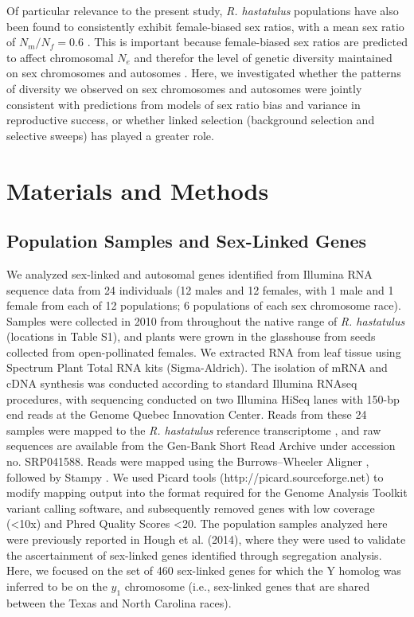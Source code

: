 \documentclass[9pt,twocolumn,twoside]{gsajnl}
\begin{document}
Of particular relevance to the present study, \textit{R. hastatulus} populations have also been found to consistently exhibit female-biased sex ratios, with a mean sex ratio of $N_{m}/N_{f}=0.6$ \citep{pickup2013influence}. This is important because female-biased sex ratios are predicted to affect chromosomal $N_{e}$ and therefor the level of genetic diversity maintained on sex chromosomes and autosomes \citep{ellegren2009}. Here, we investigated whether the patterns of diversity we observed on sex chromosomes and autosomes were jointly consistent with predictions from models of sex ratio bias and variance in reproductive success, or whether linked selection (background selection and selective sweeps) has played a greater role.

\section*{Materials and Methods}
\subsection*{Population Samples and Sex-Linked Genes}
We analyzed sex-linked and autosomal genes identified from Illumina RNA sequence data from 24 individuals (12 males and 12 females, with 1 male and 1 female from each of 12 populations; 6 populations of each sex chromosome race). Samples were collected in 2010 from throughout the native range of \textit{R. hastatulus} (locations in Table S1), and plants were grown in the glasshouse from seeds collected from open-pollinated females. We extracted RNA from leaf tissue using Spectrum Plant Total RNA kits (Sigma-Aldrich). The isolation of mRNA and cDNA synthesis was conducted according to standard Illumina RNAseq procedures, with sequencing conducted on two Illumina HiSeq lanes with 150-bp end reads at the Genome Quebec Innovation Center. Reads from these 24 samples were mapped to the \textit{R. hastatulus} reference transcriptome \citep{hough2014}, and raw sequences are available from the Gen-Bank Short Read Archive under accession no. SRP041588. Reads were mapped using the Burrows–Wheeler Aligner \citep{li2010fast}, followed by Stampy \citep{lunter2011stampy}. We used Picard tools (http://picard.sourceforge.net) to modify mapping output into the format required for the Genome Analysis Toolkit \citep{mckenna2010genome} variant calling software, and subsequently removed genes with low coverage (<10x) and Phred Quality Scores <20. The population samples analyzed here were previously reported in Hough et al. (2014), where they were used to validate the ascertainment of sex-linked genes identified through segregation analysis. Here, we focused on the set of 460 sex-linked genes for which the Y homolog was inferred to be on the $y_{1}$ chromosome (i.e., sex-linked genes that are shared between the Texas and North Carolina races).
\end{document}
